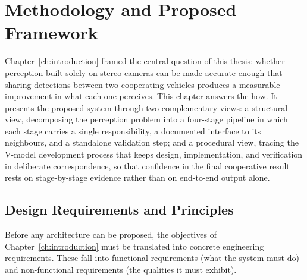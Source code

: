 \chapter{Methodology and Proposed Framework}
\label{ch:methodology}



Chapter~\ref{ch:introduction} framed the central question of this thesis: whether perception built solely on stereo cameras can be made accurate enough that sharing detections between two cooperating vehicles produces a measurable improvement in what each one perceives. This chapter answers the how. It presents the proposed system through two complementary views: a structural view, decomposing the perception problem into a four-stage pipeline in which each stage carries a single responsibility, a documented interface to its neighbours, and a standalone validation step; and a procedural view, tracing the V-model development process that keeps design, implementation, and verification in deliberate correspondence, so that confidence in the final cooperative result rests on stage-by-stage evidence rather than on end-to-end output alone.




\section{Design Requirements and Principles}
\label{sec:requirements}

Before any architecture can be proposed, the objectives of
Chapter~\ref{ch:introduction} must be translated into concrete engineering
requirements. These fall into functional requirements (what the system must do) and
non-functional requirements (the qualities it must exhibit).

